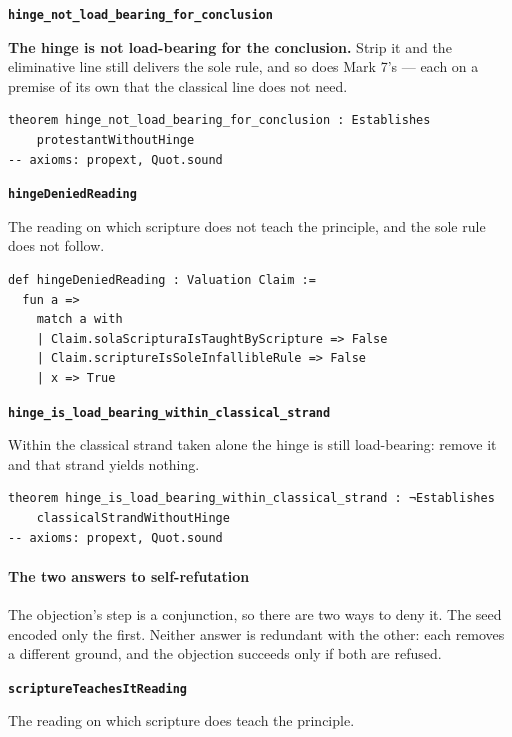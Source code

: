 \documentclass[11pt]{article}
\begin{document}
\par\medskip\noindent\textbf{\texttt{hinge\_\allowbreak{}not\_\allowbreak{}load\_\allowbreak{}bearing\_\allowbreak{}for\_\allowbreak{}conclusion}}\par\nobreak\noindent
\textbf{The hinge is not load-bearing for the conclusion.} Strip it and the eliminative line still delivers the sole rule, and so does Mark 7's — each on a premise of its own that the classical line does not need.

{\small\begin{verbatim}
theorem hinge_not_load_bearing_for_conclusion : Establishes
    protestantWithoutHinge
-- axioms: propext, Quot.sound
\end{verbatim}}
\par\medskip\noindent\textbf{\texttt{hinge\allowbreak{}Denied\allowbreak{}Reading}}\par\nobreak\noindent
The reading on which scripture does not teach the principle, and the sole rule does not follow.

{\small\begin{verbatim}
def hingeDeniedReading : Valuation Claim :=
  fun a =>
    match a with
    | Claim.solaScripturaIsTaughtByScripture => False
    | Claim.scriptureIsSoleInfallibleRule => False
    | x => True
\end{verbatim}}
\par\medskip\noindent\textbf{\texttt{hinge\_\allowbreak{}is\_\allowbreak{}load\_\allowbreak{}bearing\_\allowbreak{}within\_\allowbreak{}classical\_\allowbreak{}strand}}\par\nobreak\noindent
Within the classical strand taken alone the hinge is still load-bearing: remove it and that strand yields nothing.

{\small\begin{verbatim}
theorem hinge_is_load_bearing_within_classical_strand : ¬Establishes
    classicalStrandWithoutHinge
-- axioms: propext, Quot.sound
\end{verbatim}}
\paragraph*{The two answers to self-refutation}
\leavevmode\par
The objection's step is a conjunction, so there are two ways to deny it. The seed encoded only the first. Neither answer is redundant with the other: each removes a different ground, and the objection succeeds only if both are refused.

\par\medskip\noindent\textbf{\texttt{scripture\allowbreak{}Teaches\allowbreak{}It\allowbreak{}Reading}}\par\nobreak\noindent
The reading on which scripture does teach the principle.
\end{document}
